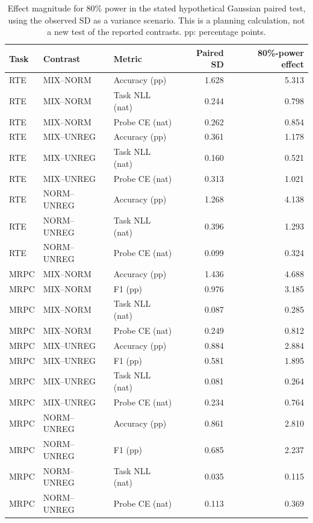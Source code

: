 \documentclass{article}
\begin{document}
\begin{table}[t]
\centering
\caption{Effect magnitude for 80\% power in the stated hypothetical Gaussian paired test, using the observed SD as a variance scenario. This is a planning calculation, not a new test of the reported contrasts. pp: percentage points.}
\label{tab:powersensitivity}
\begin{tabular}{lllrr}
\toprule
Task & Contrast & Metric & Paired SD & 80\%-power effect\\
\midrule
RTE & MIX--NORM & Accuracy (pp) & 1.628 & 5.313 \\
RTE & MIX--NORM & Task NLL (nat) & 0.244 & 0.798 \\
RTE & MIX--NORM & Probe CE (nat) & 0.262 & 0.854 \\
RTE & MIX--UNREG & Accuracy (pp) & 0.361 & 1.178 \\
RTE & MIX--UNREG & Task NLL (nat) & 0.160 & 0.521 \\
RTE & MIX--UNREG & Probe CE (nat) & 0.313 & 1.021 \\
RTE & NORM--UNREG & Accuracy (pp) & 1.268 & 4.138 \\
RTE & NORM--UNREG & Task NLL (nat) & 0.396 & 1.293 \\
RTE & NORM--UNREG & Probe CE (nat) & 0.099 & 0.324 \\
MRPC & MIX--NORM & Accuracy (pp) & 1.436 & 4.688 \\
MRPC & MIX--NORM & F1 (pp) & 0.976 & 3.185 \\
MRPC & MIX--NORM & Task NLL (nat) & 0.087 & 0.285 \\
MRPC & MIX--NORM & Probe CE (nat) & 0.249 & 0.812 \\
MRPC & MIX--UNREG & Accuracy (pp) & 0.884 & 2.884 \\
MRPC & MIX--UNREG & F1 (pp) & 0.581 & 1.895 \\
MRPC & MIX--UNREG & Task NLL (nat) & 0.081 & 0.264 \\
MRPC & MIX--UNREG & Probe CE (nat) & 0.234 & 0.764 \\
MRPC & NORM--UNREG & Accuracy (pp) & 0.861 & 2.810 \\
MRPC & NORM--UNREG & F1 (pp) & 0.685 & 2.237 \\
MRPC & NORM--UNREG & Task NLL (nat) & 0.035 & 0.115 \\
MRPC & NORM--UNREG & Probe CE (nat) & 0.113 & 0.369 \\
\bottomrule
\end{tabular}
\end{table}
\end{document}
